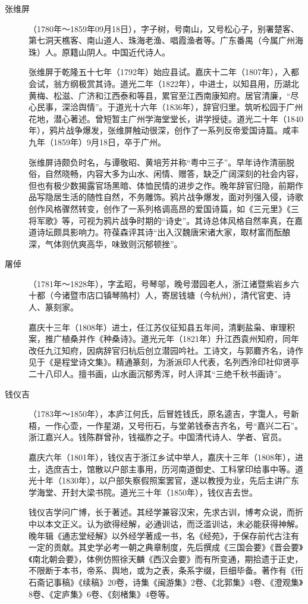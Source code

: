 \begin{description}
  \item[张维屏] （1780年～1859年09月18日），字子树，号南山，又号松心子，别署楚客、第七洞天樵客、南山道人、珠海老渔、唱霞渔者等。广东番禺（今属广州海珠）人。原籍山阴人。中国近代诗人。\par
        张维屏于乾隆五十七年（1792年）始应县试。嘉庆十二年（1807年），入都会试，翁方纲极赏其诗。道光二年（1822年），中进士，以知县用，历湖北黄梅、松滋、广济和江西泰和等县，累官至江西南康知府。居官清廉，“尽心民事，深洽舆情”。于道光十六年（1836年），辞官归里。筑听松园于广州花地，潜心著述。曾短暂主广州学海堂堂长，讲学授徒。道光二十年（1840年），鸦片战争爆发，张维屏触动很深，创作了一系列反帝爱国诗篇。咸丰九年（1859年）9月18日，卒于广州。\par
        张维屏诗颇负时名，与谭敬昭、黄培芳并称“粤中三子”。早年诗作清丽脱俗，自然晓畅，内容大多为山水、闲情、赠答，缺乏广阔深刻的社会内容，但也有极少数揭露官场黑暗、体恤民情的进步之作。晚年辞官归隐，前期作品写隐居生活的随性自然，不务雕饰。鸦片战争爆发，面对列强入侵，诗歌创作风格骤然转变，创作了一系列格调高昂的爱国诗篇，如《三元里》《三将军歌》等，可视为鸦片战争时期的“诗史”。其诗总体风格自然率真，在嘉道诗坛颇具影响力。符葆森评其诗“出入汉魏唐宋诸大家，取材富而酝酿深，气体则伉爽高华，味致则沉郁顿挫”。
  \item[屠倬] （1781年～1828年），字孟昭，号琴邬，晚号潜园老人，浙江诸暨紫岩乡六十都（今诸暨市店口镇琴隖村）人，寄居钱塘（今杭州），清代官吏、诗人、篆刻家。\par
        嘉庆十三年（1808年）进士，任江苏仪征知县五年间，清剿盐枭、审理积案，推广植桑并作《种桑诗》。道光元年（1821年）升江西袁州知府，同年改任九江知府，因病辞官归杭后创立潜园吟社。工诗文，与郭麔齐名，诗作见于《是程堂诗文集》。精通篆刻，为浙派印人代表，名列西泠印社仰贤亭二十八印人。擅书画，山水画沉郁秀浑，时人评其“三绝千秋书画诗”。
  \item[钱仪吉] （1783年～1850年），本庐江何氏，后冒姓钱氏，原名逵吉，字霭人，号新梧，一作心壶，一作星湖，又号衎石，与堂弟钱泰吉齐名，号“嘉兴二石”。浙江嘉兴人。钱陈群曾孙，钱福胙之子。中国清代诗人、学者、官员。\par
        嘉庆六年（1801年），钱仪吉于浙江乡试中举人，嘉庆十三年（1808年），进士，选庶吉士，馆散以户部主事用，历河南道御史、工科掌印给事中等。道光十年（1830年），以户部失察假照案罢官，遂以教授为业，先后主讲广东学海堂、开封大梁书院。道光三十年（1850年），钱仪吉去世。\par
        钱仪吉学问广博，长于著述。其经学兼容汉宋，先求古训，博考众说，而折中以本文正义。认为欲得经解，必通训诂，而泛滥训诂，未必能获得神解。晚年辑《通志堂经解》以外经学著成一书，名《经苑》，于保存前代古注有一定的贡献。其史学必考一朝之典章制度，先后撰成《三国会要》《晋会要》《南北朝会要》，体例仿照徐天麟《西汉会要》而有所变通，期拾遗于正史，不限断于本书，帝系、舆地，或为之表，条系字缀，巨细毕备。著作有《衎石斋记事稿》《续稿》20卷，诗集《闽游集》2卷、《北郭集》4卷、《澄观集》8卷、《定庐集》6卷、《刻楮集》4卷等。

\end{description}
